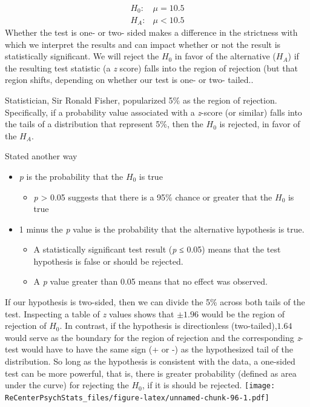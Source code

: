 \documentclass[
  11pt,
]{book}
\providecommand{\tightlist}{%
  \setlength{\itemsep}{0pt}\setlength{\parskip}{0pt}}
\begin{document}
\[
\begin{array}{ll}
H_0: & \mu = 10.5 \\
H_A: & \mu < 10.5
\end{array}
\]
Whether the test is one- or two- sided makes a difference in the strictness with which we interpret the results and can impact whether or not the result is statistically significant. We will reject the \(H_0\) in favor of the alternative (\(H_A\)) if the resulting test statistic (a \emph{z} score) falls into the region of rejection (but that region shifts, depending on whether our test is one- or two- tailed..

Statistician, Sir Ronald Fisher, popularized 5\% as the region of rejection. Specifically, if a probability value associated with a \emph{z}-score (or similar) falls into the tails of a distribution that represent 5\%, then the \(H_0\) is rejected, in favor of the \(H_A\).

Stated another way

\begin{itemize}
\tightlist
\item
  \emph{p} is the probability that the \(H_0\) is true

  \begin{itemize}
  \tightlist
  \item
    \emph{p} \textgreater{} 0.05 suggests that there is a 95\% chance or greater that the \(H_0\) is true
  \end{itemize}
\item
  1 minus the \emph{p} value is the probability that the alternative hypothesis is true.

  \begin{itemize}
  \tightlist
  \item
    A statistically significant test result (\emph{p} ≤ 0.05) means that the test hypothesis is false or should be rejected.
  \item
    A \emph{p} value greater than 0.05 means that no effect was observed.
  \end{itemize}
\end{itemize}

If our hypothesis is two-sided, then we can divide the 5\% across both tails of the test. Inspecting a table of \emph{z} values shows that \(\pm 1.96\) would be the region of rejection of \(H_0\). In contrast, if the hypothesis is directionless (two-tailed),\(1.64\) would serve as the boundary for the region of rejection and the corresponding \emph{z}-test would have to have the same sign (+ or -) as the hypothesized tail of the distribution. So long as the hypothesis is consistent with the data, a one-sided test can be more powerful, that is, there is greater probability (defined as area under the curve) for rejecting the \(H_0\), if it is should be rejected.
\texttt{[image: ReCenterPsychStats\_files/figure-latex/unnamed-chunk-96-1.pdf]}
\end{document}
